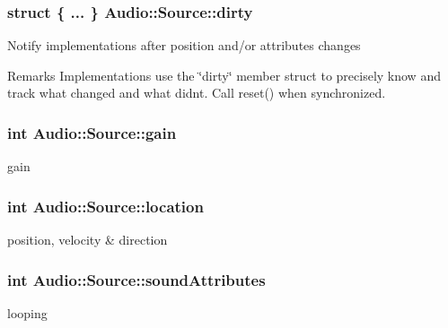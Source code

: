 \subsubsection[{\texorpdfstring{dirty}{dirty}}]{\setlength{\rightskip}{0pt plus 5cm}struct \{ ... \}   Audio\+::\+Source\+::dirty\hspace{0.3cm}{\ttfamily [protected]}}\hypertarget{classAudio_1_1Source_aa98d50cb698da93fa46833f3ffadc209}{}\label{classAudio_1_1Source_aa98d50cb698da93fa46833f3ffadc209}
Notify implementations after position and/or attributes changes \begin{DoxyRemark}{Remarks}
Implementations use the \char`\"{}dirty\char`\"{} member struct to precisely know and track what changed and what didn\textquotesingle{}t. Call reset() when synchronized. 
\end{DoxyRemark}
\subsubsection[{\texorpdfstring{gain}{gain}}]{\setlength{\rightskip}{0pt plus 5cm}int Audio\+::\+Source\+::gain}\hypertarget{classAudio_1_1Source_a928154355511c1c7495f122b30dd6f6c}{}\label{classAudio_1_1Source_a928154355511c1c7495f122b30dd6f6c}
gain 
\subsubsection[{\texorpdfstring{location}{location}}]{\setlength{\rightskip}{0pt plus 5cm}int Audio\+::\+Source\+::location}\hypertarget{classAudio_1_1Source_a62620a6925b35c7053801dc1535f7c53}{}\label{classAudio_1_1Source_a62620a6925b35c7053801dc1535f7c53}
position, velocity \& direction 
\subsubsection[{\texorpdfstring{sound\+Attributes}{soundAttributes}}]{\setlength{\rightskip}{0pt plus 5cm}int Audio\+::\+Source\+::sound\+Attributes}\hypertarget{classAudio_1_1Source_ad9042cc6660db973cc4dd9239bd2265f}{}\label{classAudio_1_1Source_ad9042cc6660db973cc4dd9239bd2265f}
looping 
